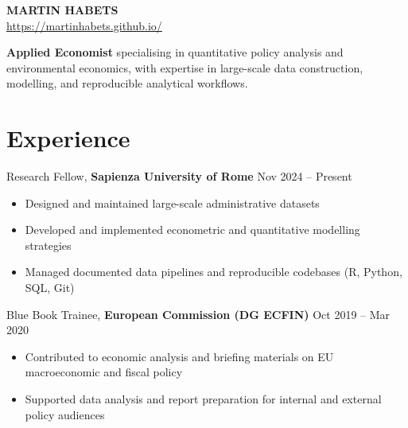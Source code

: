 \documentclass[10pt, a4paper]{article}
\begin{document}

\begin{center}
    \textbf{\Large \textbf{MARTIN HABETS}} \\ \vspace{2pt} %
    \href{https://martinhabets.github.io/}{https://martinhabets.github.io/} \
\end{center}

\textbf{Applied Economist} specialising in quantitative policy analysis and environmental economics, with expertise in large-scale data construction, modelling, and reproducible analytical workflows.




\section{Experience}
\vspace{.5em}

\quad Research Fellow, \textbf{Sapienza University of Rome} \hfill Nov 2024 -- Present
\begin{itemize}[noitemsep, topsep=0pt, before = \vspace{.2em}, after=\vspace{0.5em}]
  \item Designed and maintained large-scale administrative datasets
  \item Developed and implemented econometric and quantitative modelling strategies
  \item Managed documented data pipelines and reproducible codebases (R, Python, SQL, Git)
\end{itemize}

\quad Blue Book Trainee, \textbf{European Commission (DG ECFIN)} \hfill Oct 2019 -- Mar 2020
\begin{itemize}[noitemsep, topsep=0pt, before = \vspace{.2em}, after=\vspace{0.5em}]
  \item Contributed to economic analysis and briefing materials on EU macroeconomic and fiscal policy
  \item Supported data analysis and report preparation for internal and external policy audiences
\end{itemize}
\end{document}
